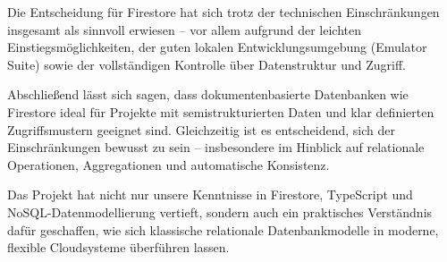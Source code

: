 \documentclass[12pt,a4paper%
              ,oneside     %
              ,titlepage
              ,DIV=13
              ,headinclude
              ,footinclude=false%
              ,cleardoublepage=empty%
              ,parskip=half,
              BCOR=0mm,
              ]{scrreprt}
\begin{document}
Die Entscheidung für Firestore hat sich trotz der technischen Einschränkungen insgesamt als sinnvoll erwiesen – vor allem aufgrund der leichten Einstiegsmöglichkeiten, der guten lokalen Entwicklungsumgebung (Emulator Suite) sowie der vollständigen Kontrolle über Datenstruktur und Zugriff.

Abschließend lässt sich sagen, dass dokumentenbasierte Datenbanken wie Firestore ideal für Projekte mit semistrukturierten Daten und klar definierten Zugriffsmustern geeignet sind. Gleichzeitig ist es entscheidend, sich der Einschränkungen bewusst zu sein – insbesondere im Hinblick auf relationale Operationen, Aggregationen und automatische Konsistenz.

Das Projekt hat nicht nur unsere Kenntnisse in Firestore, TypeScript und NoSQL-Datenmodellierung vertieft, sondern auch ein praktisches Verständnis dafür geschaffen, wie sich klassische relationale Datenbankmodelle in moderne, flexible Cloudsysteme überführen lassen.


\appendix




\renewcommand{\bibfont}{\footnotesize}
\printbibliography[title={Literaturverzeichnis}, 
                   heading=bibintoc]


{ %
\printindex
}
\end{document}
